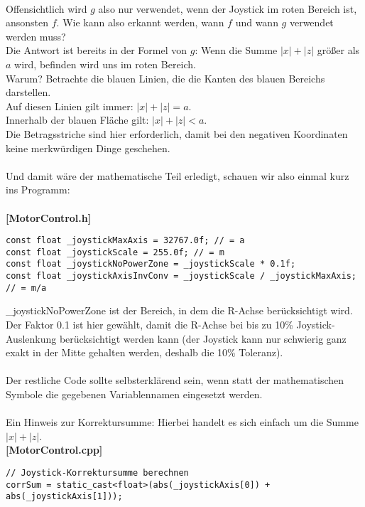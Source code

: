 \documentclass{article}
\begin{document}
\\
Offensichtlich wird $g$ also nur verwendet, wenn der Joystick im \glqq roten Bereich\grqq{} ist, ansonsten $f$. Wie kann also erkannt werden, wann $f$ und wann $g$ verwendet werden muss?\\
Die Antwort ist bereits in der Formel von $g$: Wenn die Summe $|x|+|z|$ größer als $a$ wird, befinden wird uns im roten Bereich.\\
Warum? Betrachte die blauen Linien, die die Kanten des blauen Bereichs darstellen.\\
Auf diesen Linien gilt immer: $|x|+|z|=a$.\\
Innerhalb der blauen Fläche gilt: $|x|+|z|<a$.\\
Die Betragsstriche sind hier erforderlich, damit bei den negativen Koordinaten keine merkwürdigen Dinge geschehen.\\
\\
Und damit wäre der mathematische Teil erledigt, schauen wir also einmal kurz ins Programm:\\
\\
{\footnotesize \textbf{[MotorControl.h]}}
\begin{lstlisting}
const float _joystickMaxAxis = 32767.0f; // = a
const float _joystickScale = 255.0f; // = m
const float _joystickNoPowerZone = _joystickScale * 0.1f;
const float _joystickAxisInvConv = _joystickScale / _joystickMaxAxis; // = m/a
\end{lstlisting}
\_joystickNoPowerZone ist der Bereich, in dem die R-Achse berücksichtigt wird. Der Faktor 0.1 ist hier gewählt, damit die R-Achse bei bis zu 10\% Joystick-Auslenkung berücksichtigt werden kann (der Joystick kann nur schwierig ganz exakt in der Mitte gehalten werden, deshalb die 10\% Toleranz).\\
\\
Der restliche Code sollte selbsterklärend sein, wenn statt der mathematischen Symbole die gegebenen Variablennamen eingesetzt werden.\\
\\
Ein Hinweis zur \glqq Korrektursumme\grqq{}: Hierbei handelt es sich einfach um die Summe $|x|+|z|$.\\
{\footnotesize \textbf{[MotorControl.cpp]}}
\begin{lstlisting}
// Joystick-Korrektursumme berechnen
corrSum = static_cast<float>(abs(_joystickAxis[0]) + abs(_joystickAxis[1]));

\end{lstlisting}
\end{document}
